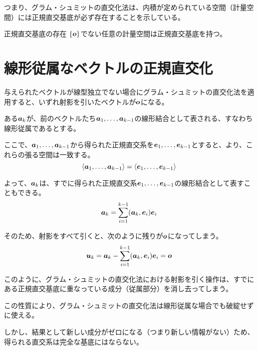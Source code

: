 \documentclass[../../../topic_linear-algebra]{subfiles}
\begin{document}
つまり、グラム・シュミットの直交化法は、内積が定められている空間（計量空間）には正規直交基底が必ず存在することを示している。

\begin{theorem*}{正規直交基底の存在}
  $\{\vb*{o}\}$でない任意の計量空間は正規直交基底を持つ。
\end{theorem*}

\sectionline
\section{線形従属なベクトルの正規直交化}\label{sec:gram-schmidt-with-dependent-vectors}

与えられたベクトルが線型独立でない場合にグラム・シュミットの直交化法を適用すると、いずれ射影を引いたベクトルが$\vb*{o}$になる。

\br

ある$\vb*{a}_k$が、前のベクトルたち$\vb*{a}_1,\ldots,\vb*{a}_{k-1}$の線形結合として表される、すなわち線形従属であるとする。

ここで、$\vb*{a}_1, \ldots, \vb*{a}_{k-1}$から得られた正規直交系を$\vb*{e}_1, \ldots, \vb*{e}_{k-1}$とすると、より、これらの張る空間は一致する。
\begin{equation*}
  \langle \vb*{a}_1, \ldots, \vb*{a}_{k-1} \rangle = \langle \vb*{e}_1, \ldots, \vb*{e}_{k-1} \rangle
\end{equation*}

よって、$\vb*{a}_k$は、すでに得られた正規直交系$\vb*{e}_1,\ldots,\vb*{e}_{k-1}$の線形結合として表すこともできる。
\begin{equation*}
  \vb*{a}_k = \sum_{i = 1}^{k-1}(\vb*{a}_k, \vb*{e}_i) \vb*{e}_i
\end{equation*}

そのため、射影をすべて引くと、次のように残りが$\vb*{o}$になってしまう。
\begin{equation*}
  \vb*{u}_k = \vb*{a}_k - \sum_{i=1}^{k-1}(\vb*{a}_k, \vb*{e}_i) \vb*{e}_i = \vb*{o}
\end{equation*}

\br

このように、グラム・シュミットの直交化法における射影を引く操作は、すでにある正規直交基底に重なっている成分（従属部分）を消し去ってしまう。

この性質により、グラム・シュミットの直交化法は線形従属な場合でも破綻せずに使える。

\br

しかし、結果として新しい成分がゼロになる（つまり新しい情報がない）ため、得られる直交系は完全な基底にはならない。
\end{document}
